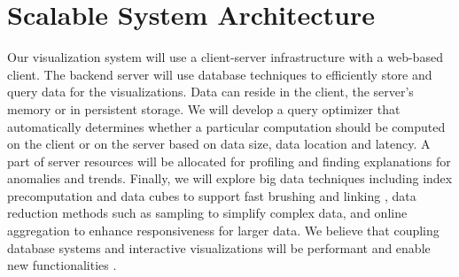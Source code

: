 \section*{Scalable System Architecture}

Our visualization system will use a client-server infrastructure with a web-based client. The backend server will use database techniques to efficiently store and query data for the visualizations. Data can reside in the client, the server's memory or in persistent storage.  We will develop a query optimizer that automatically determines whether a particular computation should be computed on the client or on the server based on data size, data location and latency.  A part of server resources will be allocated for profiling and finding explanations for anomalies and trends.  Finally, we will explore big data techniques including index precomputation and data cubes to support fast brushing and linking \cite{liu:immens, lins:nanocubes}, data reduction methods such as sampling to simplify complex data, and online aggregation \cite{hellerstein:onlineagg, agarwal:blinkdb, fisher:trustme} to enhance responsiveness for larger data. We believe that coupling database systems and interactive visualizations will be performant and enable new functionalities \cite{wu:dvms}.
